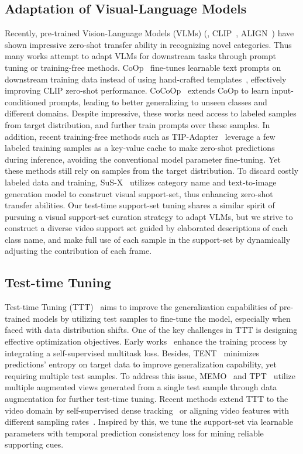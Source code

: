 \subsection{Adaptation of Visual-Language Models}
Recently, pre-trained Vision-Language Models (VLMs) (\eg, CLIP~\cite{radford2021learning}, ALIGN~\cite{jia2021scaling}) have shown impressive zero-shot transfer ability in recognizing novel categories. Thus many works attempt to adapt VLMs for downstream tasks through prompt tuning or training-free methods. CoOp~\cite{zhou2022learning} fine-tunes learnable text prompts on downstream training data instead of using hand-crafted templates~\cite{zhou2022learning}, effectively improving CLIP zero-shot performance. CoCoOp~\cite{zhou2022conditional} extends CoOp to learn input-conditioned prompts, leading to better generalizing to unseen classes and different domains. Despite impressive, these works need access to labeled samples from target distribution, and further train prompts over these samples. In addition, recent training-free methods such as TIP-Adapter~\cite{zhang2021tipadaptertrainingfreeclipadapterbetter} leverage a few labeled training samples as a key-value cache to make zero-shot predictions during inference, avoiding the conventional model parameter fine-tuning. Yet these methods still rely on samples from the target distribution. To discard costly labeled data and training, SuS-X~\cite{udandarao2022sus-x} utilizes category name and text-to-image generation model to construct visual support-set, thus enhancing zero-shot transfer abilities. Our test-time support-set tuning shares a similar spirit of pursuing a visual support-set curation strategy to adapt VLMs, but we strive to construct a diverse video support set guided by elaborated descriptions of each class name, and make full use of each sample in the support-set by dynamically adjusting the contribution of each frame.

\subsection{Test-time Tuning}
Test-time Tuning (TTT)~\cite{shocher2018zero,nitzan2022mystyle,xie2023sepico} aims to improve the generalization capabilities of pre-trained models by utilizing test samples to fine-tune the model, especially when faced with data distribution shifts. One of the key challenges in TTT is designing effective optimization objectives. Early works~\cite{sun2020test,liu2021ttt} enhance the training process by integrating a self-supervised multitask loss. Besides, TENT~\cite{wang2020tent} minimizes predictions' entropy on target data to improve generalization capability, yet requiring multiple test samples. To address this issue, MEMO~\cite{zhang2022memo} and TPT~\cite{shu2022tpt} utilize multiple augmented views generated from a single test sample through data augmentation for further test-time tuning. Recent methods extend TTT to the video domain by self-supervised dense tracking~\cite{azimi2022self} or aligning video features with different sampling rates~\cite{zeng2023exploring}. Inspired by this, we tune the support-set via learnable parameters with temporal prediction consistency loss for mining reliable supporting cues.
